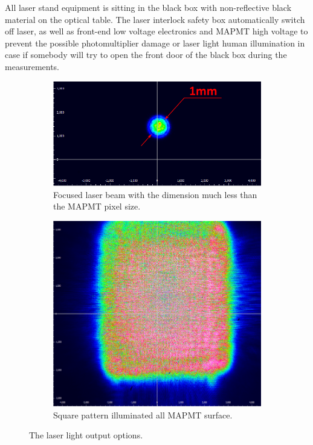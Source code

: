 All laser stand equipment is sitting in the black box with non-reflective black material on the optical table. The laser interlock safety box automatically switch off laser, as well as front-end low voltage  electronics and MAPMT high voltage to prevent the possible photomultiplier damage or laser light human illumination in case if somebody will try to open the front door of the black box during the measurements.

\begin{figure}[bt]
	\centering
	\begin{subfigure}[b]{0.628\linewidth}
		\includegraphics[width=\textwidth]{figures/beamspot.pdf}
		\caption{Focused laser beam with the dimension much less than the  MAPMT pixel size.}
		\label{fig:beamopt1}
	\end{subfigure}
	\begin{subfigure}[b]{0.354\linewidth}
		\includegraphics[width=\textwidth]{figures/beamsquare.pdf}
		\caption{Square pattern illuminated all MAPMT surface.}
		\label{fig:beamopt2}
	\end{subfigure}
	\caption{The laser light output options.}
\end{figure}

